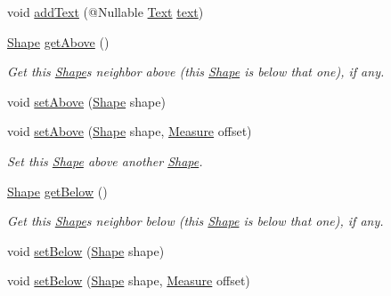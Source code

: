 \begin{DoxyCompactItemize}
void \hyperlink{classcom_1_1aarrelaakso_1_1drawl_1_1_shape_a9784264f6abcf623b2774d6ef2a53fdc}{add\+Text} (@Nullable \hyperlink{classcom_1_1aarrelaakso_1_1drawl_1_1_text}{Text} \hyperlink{classcom_1_1aarrelaakso_1_1drawl_1_1_shape_ab54afc2d95d3447532f5ecf3fec3faa8}{text})
\item 
\hyperlink{classcom_1_1aarrelaakso_1_1drawl_1_1_shape}{Shape} \hyperlink{classcom_1_1aarrelaakso_1_1drawl_1_1_shape_acebea2aa57031322323c9bf50ee447db}{get\+Above} ()
\begin{DoxyCompactList}\small\item\em Get this \hyperlink{classcom_1_1aarrelaakso_1_1drawl_1_1_shape}{Shape}\textquotesingle{}s neighbor above (this \hyperlink{classcom_1_1aarrelaakso_1_1drawl_1_1_shape}{Shape} is below that one), if any. \end{DoxyCompactList}\item 
void \hyperlink{classcom_1_1aarrelaakso_1_1drawl_1_1_shape_a942b3cf3365498dc1ac6b0309ce33b86}{set\+Above} (\hyperlink{classcom_1_1aarrelaakso_1_1drawl_1_1_shape}{Shape} shape)
\item 
void \hyperlink{classcom_1_1aarrelaakso_1_1drawl_1_1_shape_aab165a65f7bd1e55a6de7166577725a3}{set\+Above} (\hyperlink{classcom_1_1aarrelaakso_1_1drawl_1_1_shape}{Shape} shape, \hyperlink{classcom_1_1aarrelaakso_1_1drawl_1_1_measure}{Measure} offset)
\begin{DoxyCompactList}\small\item\em Set this \hyperlink{classcom_1_1aarrelaakso_1_1drawl_1_1_shape}{Shape} above another \hyperlink{classcom_1_1aarrelaakso_1_1drawl_1_1_shape}{Shape}. \end{DoxyCompactList}\item 
\hyperlink{classcom_1_1aarrelaakso_1_1drawl_1_1_shape}{Shape} \hyperlink{classcom_1_1aarrelaakso_1_1drawl_1_1_shape_a53de5ab609d879719cd3b372dfe8df58}{get\+Below} ()
\begin{DoxyCompactList}\small\item\em Get this \hyperlink{classcom_1_1aarrelaakso_1_1drawl_1_1_shape}{Shape}\textquotesingle{}s neighbor below (this \hyperlink{classcom_1_1aarrelaakso_1_1drawl_1_1_shape}{Shape} is below that one), if any. \end{DoxyCompactList}\item 
void \hyperlink{classcom_1_1aarrelaakso_1_1drawl_1_1_shape_aa0ec0030515b5096820e4dd030c0b320}{set\+Below} (\hyperlink{classcom_1_1aarrelaakso_1_1drawl_1_1_shape}{Shape} shape)
\item 
void \hyperlink{classcom_1_1aarrelaakso_1_1drawl_1_1_shape_aa0dd6332c22877c42b8c3863e5cc579e}{set\+Below} (\hyperlink{classcom_1_1aarrelaakso_1_1drawl_1_1_shape}{Shape} shape, \hyperlink{classcom_1_1aarrelaakso_1_1drawl_1_1_measure}{Measure} offset)

\end{DoxyCompactItemize}
